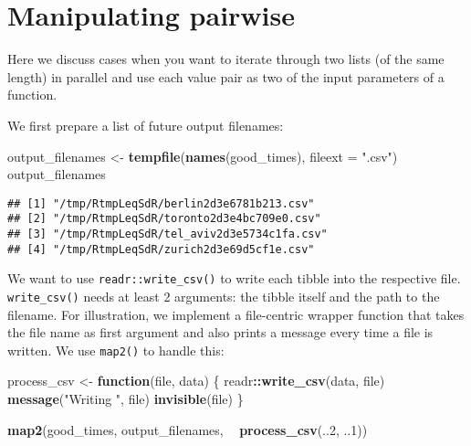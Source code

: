 \documentclass[]{book}
\newenvironment{Shaded}{\begin{snugshade}}{\end{snugshade}}
\newcommand{\ControlFlowTok}[1]{\textcolor[rgb]{0.13,0.29,0.53}{\textbf{#1}}}
\newcommand{\DataTypeTok}[1]{\textcolor[rgb]{0.13,0.29,0.53}{#1}}
\newcommand{\DecValTok}[1]{\textcolor[rgb]{0.00,0.00,0.81}{#1}}
\newcommand{\KeywordTok}[1]{\textcolor[rgb]{0.13,0.29,0.53}{\textbf{#1}}}
\newcommand{\NormalTok}[1]{#1}
\newcommand{\OperatorTok}[1]{\textcolor[rgb]{0.81,0.36,0.00}{\textbf{#1}}}
\newcommand{\StringTok}[1]{\textcolor[rgb]{0.31,0.60,0.02}{#1}}
\begin{document}
\hypertarget{manipulating-pairwise}{%
\section{Manipulating pairwise}\label{manipulating-pairwise}}

Here we discuss cases when you want to iterate through two lists (of the same length) in parallel and use each value pair as two of the input parameters of a function.

We first prepare a list of future output filenames:

\begin{Shaded}
\begin{Highlighting}[]
\NormalTok{output_filenames <-}\StringTok{ }\KeywordTok{tempfile}\NormalTok{(}\KeywordTok{names}\NormalTok{(good_times), }\DataTypeTok{fileext =} \StringTok{".csv"}\NormalTok{)}
\NormalTok{output_filenames}
\end{Highlighting}
\end{Shaded}

\begin{verbatim}
## [1] "/tmp/RtmpLeqSdR/berlin2d3e6781b213.csv"  
## [2] "/tmp/RtmpLeqSdR/toronto2d3e4bc709e0.csv" 
## [3] "/tmp/RtmpLeqSdR/tel_aviv2d3e5734c1fa.csv"
## [4] "/tmp/RtmpLeqSdR/zurich2d3e69d5cf1e.csv"
\end{verbatim}

We want to use \texttt{readr::write\_csv()} to write each tibble into the respective file.
\texttt{write\_csv()} needs at least 2 arguments: the tibble itself and the path to the filename.
For illustration, we implement a file-centric wrapper function that takes the file name as first argument and also prints a message every time a file is written.
We use \texttt{map2()} to handle this:

\begin{Shaded}
\begin{Highlighting}[]
\NormalTok{process_csv <-}\StringTok{ }\ControlFlowTok{function}\NormalTok{(file, data) \{}
\NormalTok{  readr}\OperatorTok{::}\KeywordTok{write_csv}\NormalTok{(data, file)}
  \KeywordTok{message}\NormalTok{(}\StringTok{"Writing "}\NormalTok{, file)}
  \KeywordTok{invisible}\NormalTok{(file)}
\NormalTok{\}}

\KeywordTok{map2}\NormalTok{(good_times, output_filenames, }\OperatorTok{~}\StringTok{ }\KeywordTok{process_csv}\NormalTok{(..}\DecValTok{2}\NormalTok{, ..}\DecValTok{1}\NormalTok{))}
\end{Highlighting}
\end{Shaded}
\end{document}
